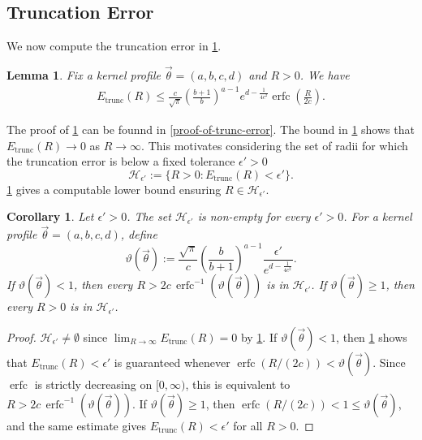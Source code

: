 \documentclass[10pt,reqno]{article}
\numberwithin{equation}{section}
\theoremstyle{plain}
\newtheorem{lem}[thm]{Lemma}
\newtheorem{cor}[thm]{Corollary}
\theoremstyle{definition}
\begin{document}
\subsection{Truncation Error}\label{truncation-error}
We now compute the truncation error in \cref{trunc-error}.

\begin{lem}\label{trunc-error}
Fix a kernel profile \(\vec\theta=(a,b,c,d)\) and \(R>0\). We have
\begin{align}
E_{\mathrm{trunc}}(R) \leq \frac{c}{\sqrt{\pi}}\left(\frac{b+1}{b}\right)^{a-1}e^{d-\frac{1}{4c^2}}\operatorname{erfc}\left(\frac{R}{2c}\right).
\label{trunc-comp}
\end{align}
\end{lem}

The proof of \cref{trunc-error} can be founnd in \cref{proof-of-trunc-error}. The bound in \cref{trunc-error} shows that \(E_{\mathrm{trunc}}(R)\to 0\) as \(R\to\infty\). This motivates considering the set of radii for which the truncation error is below a fixed tolerance \(\epsilon'>0\)
\begin{equation}\label{g-def}
\mathcal H_{\epsilon'}:=\{R>0:E_{\mathrm{trunc}}(R)<\epsilon'\}.
\end{equation}
\cref{radii-lower-bd} gives a computable lower bound ensuring \(R\in\mathcal H_{\epsilon'}\).


\begin{cor}\label{radii-lower-bd}
Let \(\epsilon'>0\). The set \(\mathcal H_{\epsilon'}\) is non-empty for every \(\epsilon'>0\). For a kernel profile \(\vec{\theta}=(a,b,c,d)\), define
\begin{equation}
\vartheta(\vec\theta) := \frac{\sqrt{\pi}}{c}\left(\frac{b}{b+1}\right)^{a-1}\frac{\epsilon'}{e^{d-\frac{1}{4c^2}}}.
\end{equation}
If \(\vartheta(\vec\theta)<1\), then every \(R>2c\,\operatorname{erfc}^{-1}(\vartheta(\vec\theta))\) is in \(\mathcal H_{\epsilon'}\). If \(\vartheta(\vec\theta)\ge 1\), then every \(R>0\) is in \(\mathcal H_{\epsilon'}\).
\end{cor}

\begin{proof}
\(\mathcal H_{\epsilon'}\neq\emptyset\) since \(\lim_{R\to\infty}E_{\mathrm{trunc}}(R)=0\) by \cref{trunc-error}. If \(\vartheta(\vec{\theta})<1\), then \cref{trunc-error} shows that \(E_{\mathrm{trunc}}(R)<\epsilon'\) is guaranteed whenever \(\operatorname{erfc}(R/(2c))<\vartheta(\vec\theta)\). Since \(\operatorname{erfc}\) is strictly decreasing on \([0,\infty)\), this is equivalent to \(R>2c\,\operatorname{erfc}^{-1}(\vartheta(\vec\theta))\). If \(\vartheta(\vec{\theta})\ge 1\), then \(\operatorname{erfc}(R/(2c))<1\leq \vartheta(\vec\theta)\), and the same estimate gives \(E_{\mathrm{trunc}}(R)<\epsilon'\) for all \(R>0\).
\end{proof}
\end{document}
